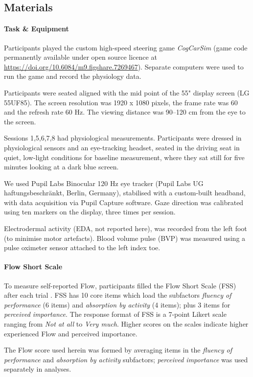 \documentclass[10pt,letterpaper,floatsintext]{article}
\begin{document}
\subsection*{Materials}
\paragraph{Task \& Equipment} Participants played the custom high-speed steering game {\it CogCarSim} (game code permanently available under open source licence at \url{https://doi.org/10.6084/m9.figshare.7269467}). Separate computers were used to run the game and record the physiology data.

Participants were seated aligned with the mid point of the 55" display screen (LG 55UF85). The screen resolution was 1920 x 1080 pixels, the frame rate was 60 and the refresh rate 60 Hz. The viewing distance was 90--120 cm from the eye to the screen.

Sessions 1,5,6,7,8 had physiological measurements. Participants were dressed in physiological sensors and an eye-tracking headset, seated in the driving seat in quiet, low-light conditions for baseline measurement, where they sat still for five minutes looking at a dark blue screen.

We used Pupil Labs Binocular 120 Hz eye tracker (Pupil Labs UG haftungsbeschränkt, Berlin, Germany), stabilised with a custom-built headband, with data acquisition via Pupil Capture software. Gaze direction was calibrated using ten markers on the display, three times per session.

Electrodermal activity (EDA, not reported here),  was recorded from the left foot (to minimise motor artefacts). Blood volume pulse (BVP) was measured using a pulse oximeter sensor attached to the left index toe.

\paragraph{Flow Short Scale} To measure self-reported Flow, participants filled the Flow Short Scale (FSS) after each trial \cite{Rheinberg2003,Engeser2008}. FSS has 10 core items which load the subfactors {\it fluency of performance} (6 items) and {\it absorption by activity} (4 items); plus 3 items for {\it perceived importance}. The response format of FSS is a 7-point Likert scale ranging from {\it Not at all} to {\it Very much}. Higher scores on the scales indicate higher experienced Flow and perceived importance.

The Flow score used herein was formed by averaging items in the {\it fluency of performance} and {\it absorption by activity} subfactors; {\it perceived importance} was used separately in analyses.
\end{document}
